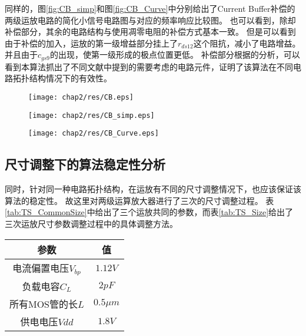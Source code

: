 同样的，图\ref{fig:CB_simp}和图\ref{fig:CB_Curve}中分别给出了Current Buffer补偿的两级运放电路的简化小信号电路图与对应的频率响应比较图。
也可以看到，除却补偿部分，其余的电路结构与使用凋零电阻的补偿方式基本一致。
但是可以看到由于补偿的加入，运放的第一级增益部分挂上了$r_{ds12}$这个阻抗，减小了电路增益。
并且由于$c_{gs9}$的出现，使第一级形成的极点位置更低。
补偿部分根据\parencite{CB1,CB2,Allen-Analog}的分析，可以看到本算法抓出了不同文献中提到的需要考虑的电路元件，证明了该算法在不同电路拓扑结构情况下的有效性。

\begin{figure}[!htp]
	\centering
	\texttt{[image: chap2/res/CB.eps]}
\end{figure}

\begin{figure}[!htp]
	\centering
	\texttt{[image: chap2/res/CB\_simp.eps]}
\end{figure}

\begin{figure}[!htp]
	\centering
	\texttt{[image: chap2/res/CB\_Curve.eps]}
\end{figure}

\subsection{尺寸调整下的算法稳定性分析}
\label{subsec:simp:res:size}

同时，针对同一种电路拓扑结构，在运放有不同的尺寸调整情况下，也应该保证该算法的稳定性。
故这里对两级运算放大器进行了三次的尺寸调整过程。
表\ref{tab:TS_CommonSize}中给出了三个运放共同的参数，而表\ref{tab:TS_Size}给出了三次运放尺寸参数调整过程中的具体调整方法。

\begin{table}[!htbp]
	\centering
	\begin{tabular}{c|c}
		\hline
		      参数       &     值      \\ \hline
		电流偏置电压$V_{bp}$ &  $1.12 V$  \\
		  负载电容$C_L$    &   $2pF$    \\
		 所有MOS管的长$L$   & $0.5\mu m$ \\
		  供电电压$Vdd$    &   $1.8V$   \\ \hline
	\end{tabular}
\end{table}

